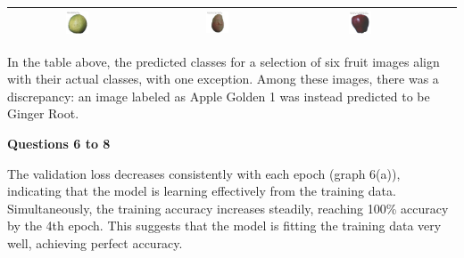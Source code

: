 \documentclass[a4paper,10 pt]{article}
\begin{document}
\begin{table}[H]
\begin{tabular}{|c|c|c|c|c|}
        \includegraphics[width=0.17\textwidth]{image8.png} &
        \includegraphics[width=0.17\textwidth]{image9.png} &
        \includegraphics[width=0.17\textwidth]{image10.png} \\
        \hline
    \end{tabular}
\end{table}

In the table above, the predicted classes for a selection of six fruit images align with their actual classes, with one exception. Among these images, there was a discrepancy: an image labeled as Apple Golden 1 was instead predicted to be Ginger Root. 

\vspace{12pt}

\vspace{12pt}

  {\Large \textbf {Questions 6 to 8}}
  \vspace{12pt}


  The validation loss decreases consistently with each epoch (graph 6(a)), indicating that the model is learning effectively from the training data. Simultaneously, the training accuracy increases steadily, reaching 100\% accuracy by the 4th epoch. This suggests that the model is fitting the training data very well, achieving perfect accuracy.

  \vspace{12pt}
\end{document}
